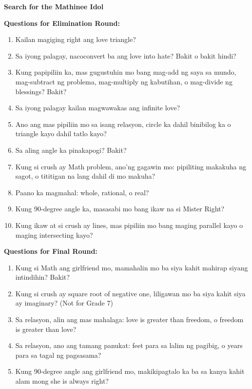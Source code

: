 \documentclass[11pt]{article}
\begin{document}
 


\begin{center}
\textbf{Search for the Mathinee Idol}
\end{center} 

\textbf{Questions for Elimination Round: }
{\begin{enumerate}[label = \arabic*. ]
\item Kailan magiging right ang love triangle?
\item Sa iyong palagay, nacoconvert ba ang love into hate? Bakit o bakit hindi?
\item Kung papipiliin ka, mas gugustuhin mo bang mag-add ng saya sa mundo, mag-subtract ng problema, mag-multiply ng kabutihan, o mag-divide ng blessings? Bakit?
\item Sa iyong palagay kailan magwawakas ang infinite love?
\item Ano ang mas pipiliin mo sa isang relasyon, circle ka dahil binibilog ka o triangle kayo dahil tatlo kayo?
\item Sa aling angle ka pinakapogi? Bakit?
\item Kung si crush ay Math problem, ano'ng gagawin mo: pipiliting makakuha ng sagot, o tititigan na lang dahil di mo makuha?
\item Paano ka magmahal: whole, rational, o real?
\item Kung 90-degree angle ka, masasabi mo bang ikaw na si Mister Right?
\item Kung ikaw at si crush ay lines, mas pipiliin mo bang maging parallel kayo o maging intersecting kayo? 
\end{enumerate}}

\newpage 

\textbf{Questions for Final Round:} 
\begin{enumerate}[label = \arabic*. ]
\item Kung si Math ang girlfriend mo, mamahalin mo ba siya kahit mahirap siyang intindihin? Bakit? 
\item Kung si crush ay square root of negative one, liligawan mo ba siya kahit siya ay imaginary? (Not for Grade 7) 
\item Sa relasyon, alin ang mas mahalaga: love is greater than freedom, o freedom is greater than love? 
\item Sa relasyon, ano ang tamang panukat: feet para sa lalim ng pagibig, o years para sa tagal ng pagsasama?
\item Kung 90-degree angle ang girlfriend mo, makikipagtalo ka ba sa kanya kahit alam mong she is always right?
\end{enumerate} 
\end{document}
